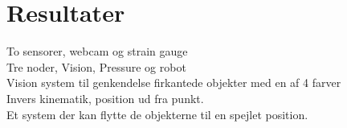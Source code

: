\chapter{Resultater}\label{chap:Resultater}
To sensorer, webcam og strain gauge\\
Tre noder, Vision, Pressure og robot\\
Vision system til genkendelse firkantede objekter med en af 4 farver\\
Invers kinematik, position ud fra punkt.\\
Et system der kan flytte de objekterne til en spejlet position.